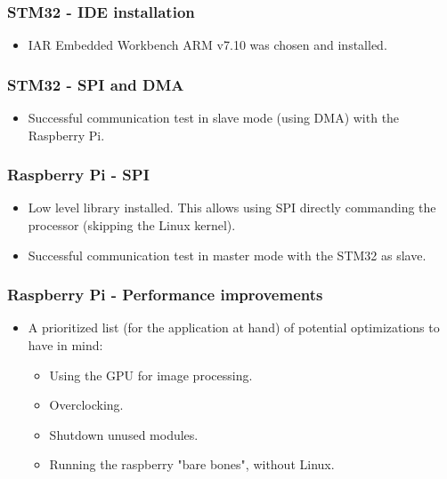 
\subsubsection{STM32 - IDE installation}

\begin{itemize}
	\item IAR Embedded Workbench ARM v7.10 was chosen and installed.
\end{itemize}


\subsubsection{STM32 - SPI and DMA}
\begin{itemize}
	\item Successful communication test in slave mode (using DMA) with the Raspberry Pi.
\end{itemize}


\subsubsection{Raspberry Pi - SPI}

\begin{itemize}
	\item Low level library installed. This allows using SPI directly commanding the processor (skipping the Linux kernel).
	\item Successful communication test in master mode with the STM32 as slave.
\end{itemize}


\subsubsection{Raspberry Pi - Performance improvements}

\begin{itemize}
	\item A prioritized list (for the application at hand) of potential optimizations to have in mind:
	\begin{itemize}
		\item Using the GPU for image processing.
		\item Overclocking.
		\item Shutdown unused modules.
		\item Running the raspberry "bare bones", without Linux.
	\end{itemize}
\end{itemize}
